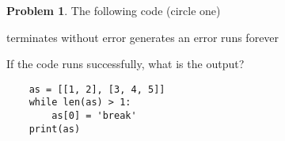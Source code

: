 \documentclass[10pt]{article}
\theoremstyle{definition}
\newtheorem{problem}{Problem}
\begin{document}
\begin{problem}
    The following code (circle one)

    \vspace{0.25in}
    \hspace{0.5in}terminates without error 
    \hspace{1in}generates an error
    \hspace{1in}runs forever
    \vspace{0.25in}

    \noindent
    If the code runs successfully, what is the output?
\end{problem}
\begin{lstlisting}
    as = [[1, 2], [3, 4, 5]]
    while len(as) > 1:
        as[0] = 'break'
    print(as)
\end{lstlisting}
\vspace{1.5in}
\end{document}
